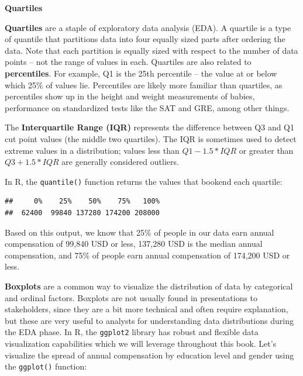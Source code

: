 \documentclass[
]{book}
\newenvironment{Shaded}{\begin{snugshade}}{\end{snugshade}}
\newcommand{\CommentTok}[1]{\textcolor[rgb]{0.56,0.35,0.01}{\textit{#1}}}
\newcommand{\FunctionTok}[1]{\textcolor[rgb]{0.00,0.00,0.00}{#1}}
\newcommand{\NormalTok}[1]{#1}
\newcommand{\SpecialCharTok}[1]{\textcolor[rgb]{0.00,0.00,0.00}{#1}}
\begin{document}
\textbf{Quartiles}

\textbf{Quartiles} are a staple of exploratory data analysis (EDA). A quartile is a type of quantile that partitions data into four equally sized parts after ordering the data. Note that each partition is equally sized with respect to the number of data points -- not the range of values in each. Quartiles are also related to \textbf{percentiles}. For example, Q1 is the 25th percentile -- the value at or below which 25\% of values lie. Percentiles are likely more familiar than quartiles, as percentiles show up in the height and weight measurements of babies, performance on standardized tests like the SAT and GRE, among other things.

The \textbf{Interquartile Range (IQR)} represents the difference between Q3 and Q1 cut point values (the middle two quartiles). The IQR is sometimes used to detect extreme values in a distribution; values less than \(Q1 - 1.5 * IQR\) or greater than \(Q3 + 1.5 * IQR\) are generally considered outliers.

In R, the \texttt{quantile()} function returns the values that bookend each quartile:

\begin{Shaded}
\end{Shaded}

\begin{verbatim}
##     0%    25%    50%    75%   100% 
##  62400  99840 137280 174200 208000
\end{verbatim}

Based on this output, we know that 25\% of people in our data earn annual compensation of 99,840 USD or less, 137,280 USD is the median annual compensation, and 75\% of people earn annual compensation of 174,200 USD or less.

\textbf{Boxplots} are a common way to visualize the distribution of data by categorical and ordinal factors. Boxplots are not usually found in presentations to stakeholders, since they are a bit more technical and often require explanation, but these are very useful to analysts for understanding data distributions during the EDA phase. In R, the \texttt{ggplot2} library has robust and flexible data visualization capabilities which we will leverage throughout this book. Let's visualize the spread of annual compensation by education level and gender using the \texttt{ggplot()} function:
\end{document}
